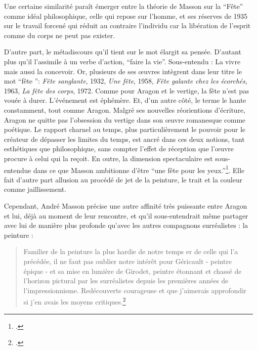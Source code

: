 	Une certaine similarité paraît émerger entre la théorie de Masson sur la \enquote{Fête} comme idéal philosophique, celle qui repose sur l’homme, et ses réserves de 1935 sur le travail forcené qui réduit au contraire l’individu car la libération de l’esprit comme du corps ne peut pas exister. 

	D’autre part, le métadiscours qu’il tient sur le mot élargit sa pensée. D’autant plus qu’il l’assimile à un verbe d’action, \enquote{faire la vie}. Sous-entendu : La vivre mais aussi la concevoir. Or, plusieurs de ses \oe{}uvres intègrent dans leur titre le mot \enquote{fête }: \emph{Fête sanglante}, 1932, \emph{Une fête}, 1958, \emph{Fête galante chez les écorchés,} 1963, \emph{La fête des corps}, 1972. Comme pour Aragon et le vertige, la fête n’est pas vouée à durer. L’événement est éphémère. Et, d’un autre côté, le terme le hante constamment, tout comme Aragon. Malgré ses nouvelles réorientions d’écriture, Aragon ne quitte pas l’obsession du vertige dans son \oe{}uvre romanesque comme poétique. Le rapport charnel au temps, plus particulièrement le pouvoir pour le créateur de dépasser les limites du temps, est ancré dans ces deux notions, tant esthétiques que philosophique, sans compter l’effet de réception que l’\oe{}uvre procure à celui qui la reçoit. En outre, la dimension spectaculaire est sous-entendue dans ce que Masson ambitionne d’être \enquote{une fête pour les yeux.}\footcite{memoiremonde}. Elle fait d’autre part allusion au procédé de jet de la peinture, le trait et la couleur comme jaillissement. 

	Cependant, André Masson précise une autre affinité très puissante entre Aragon et lui, déjà au moment de leur rencontre, et qu’il sous-entendrait même partager avec lui de manière plus profonde qu’avec les autres compagnons surréalistes : la peinture :

	\begin{quote}Familier de la peinture la plus hardie de notre temps er de celle qui l’a précédée, il ne faut pas oublier notre intérêt pour Géricault - peintre épique - et sa mise en lumière de Girodet, peintre étonnant et chassé de l’horizon pictural par les surréalistes depuis les premières années de l’impressionnisme. Redécouverte  courageuse et que j’aimerais approfondir si j’en avais les moyens critiques.\footcite[p85]{rebelle}\end{quote}
	
